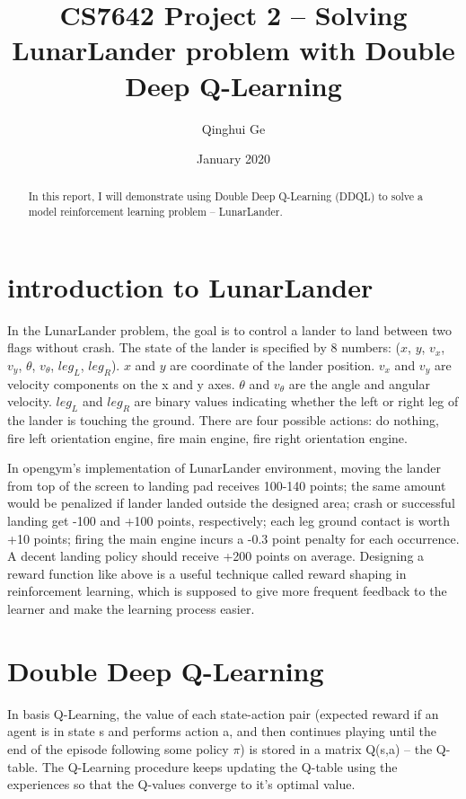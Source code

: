 \documentclass[conference]{IEEEtran}
\title{CS7642 Project 2 -- Solving LunarLander problem with Double Deep Q-Learning}
\author{Qinghui Ge}
\date{January 2020}
\begin{document}
	
	\maketitle
	
\begin{abstract}
	In this report, I will demonstrate using Double Deep Q-Learning (DDQL) to solve a model reinforcement learning problem -- LunarLander. 
\end{abstract}
	
\section{introduction to LunarLander}
In the LunarLander problem, the goal is to control a lander to land between two flags without crash. The state of the lander is specified by 8 numbers: ($x$, $y$, $v_x$, $v_y$, $\theta$, $v_\theta$, $leg_L$, $leg_R$).
$x$ and $y$ are coordinate of the lander position. $v_x$ and $v_y$ are velocity components on the x and y axes. $\theta$ and $v_\theta$ are the angle and angular velocity. $leg_L$ and $leg_R$ are binary values indicating whether the left or right leg of the lander is touching the ground. There are four possible actions: do nothing, fire left orientation engine, fire main engine, fire right orientation engine.

In opengym's implementation of LunarLander environment, moving the lander from top of the screen to landing pad receives 100-140 points; the same amount would be penalized if lander landed outside the designed area; crash or successful landing get -100 and +100 points, respectively; each leg ground contact is worth +10 points; firing the main engine incurs a -0.3 point penalty for each occurrence. A decent landing policy should receive +200 points on average. Designing a reward function like above is a useful technique called reward shaping in reinforcement learning, which is supposed to give more frequent feedback to the learner and make the learning process easier. 

\section{Double Deep Q-Learning}
In basis Q-Learning, the value of each state-action pair (expected reward if an agent is in state s and performs action a, and then continues playing until the end of the episode following some policy $\pi$) is stored in a matrix Q(s,a) -- the Q-table. The Q-Learning procedure keeps updating the Q-table using the experiences so that the Q-values converge to it's optimal value. 
\end{document}
